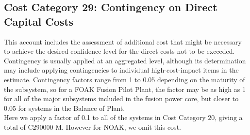 \subsection{Cost Category 29: Contingency on Direct Capital Costs}

This account includes the assessment of additional cost that might be necessary to achieve the desired confidence level for the direct costs not to be exceeded. Contingency is usually applied at an aggregated level, although its determination may include applying contingencies to individual high-cost-impact items in the estimate.  Contingency factors range from 1 to 0.05 depending on the maturity of the subsystem, so for a FOAK Fusion Pilot Plant, the factor may be as high as 1 for all of the major subsystems included in the fusion power core, but closer to 0.05 for systems in the Balance of Plant.  \\

Here we apply a factor of 0.1 to all of the systems in Cost Category 20, giving a total of  C290000 M. {\color{blue} However for NOAK, we omit this cost.}

